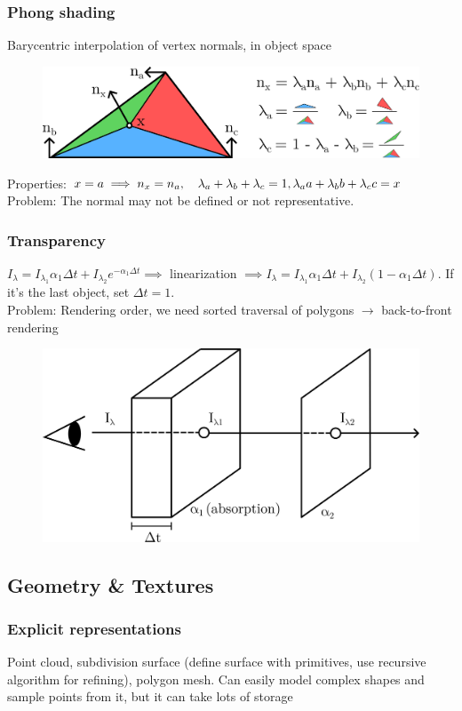 \documentclass[a4paper,10pt]{article}
\begin{document}
\subsubsection{Phong shading} Barycentric interpolation of vertex normals, in object space
\begin{figure}[H]
    \includegraphics[width=\linewidth]{phong-shading.png}
\end{figure}

Properties: \( x = a \implies n_x = n_a, \quad \lambda_a+\lambda_b +\lambda_c = 1, \\ \lambda_a a+ \lambda_b b + \lambda_c c = x \)
Problem: The normal may not be defined or not representative.

\subsubsection{Transparency} \( I_\lambda = I_{\lambda_1} \alpha_1 \Delta t + I_{\lambda_2} e^{-\alpha_1 \Delta t} \implies \) linearization \( \implies I_\lambda = I_{\lambda_1} \alpha_1 \Delta t + I_{\lambda_2} (1-\alpha_1 \Delta t) \). If it's the last object, set \( \Delta t = 1 \). \\
Problem: Rendering order, we need sorted traversal of polygons \( \to  \) back-to-front rendering

\begin{figure}[h]
    \centering
    \includegraphics[width=0.6\linewidth]{transparency.png}
\end{figure}

\subsection{Geometry \& Textures}
\subsubsection{Explicit representations} Point cloud, subdivision surface (define surface with primitives, use recursive algorithm for refining), polygon mesh. Can easily model complex shapes and sample points from it, but it can take lots of storage
\end{document}
